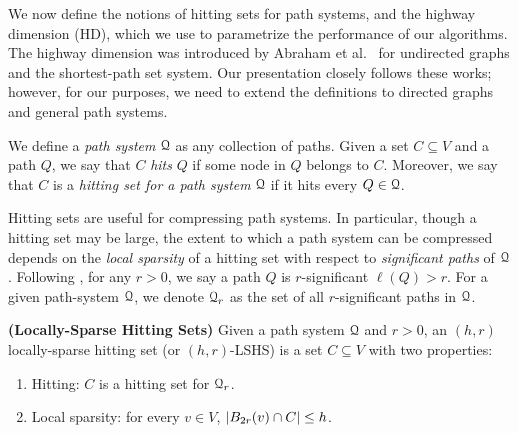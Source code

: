 
We now define the notions of hitting sets for path systems, and the highway dimension (HD), which we use to parametrize the performance of our algorithms. The highway dimension was introduced by Abraham et al.~\cite{highway2010,highway2013} for undirected graphs and the shortest-path set system. Our presentation closely follows these works; however, for our purposes, we need to extend the definitions to directed graphs and general path systems. 

We define a \emph{path system} $\calQ$ as any collection of paths. Given a set $C\subseteq V$ and a path $Q$, we say that $C$ \emph{hits} $Q$ if some node in $Q$ belongs to $C$. Moreover, we say that $C$ is a \emph{hitting set for a path system} $\calQ$ if it hits every $Q\in\calQ$.


Hitting sets are useful for compressing path systems. In particular, though a hitting set may be large, the extent to which a path system can be compressed depends on the \emph{local sparsity} of a hitting set with respect to \emph{significant paths} of $\calQ$. 
Following \cite{highway2013}, for any $r>0$, we say a path $Q$ is $r$-significant $\ell(Q)>r$. For a given path-system $\calQ$, we denote $\calQ_r$ as the set of all $r$-significant paths in $\calQ$.
\begin{definition}
\label{def:lshs}
\textbf{(Locally-Sparse Hitting Sets)} Given a path system $\calQ$ and $r>0$, an $(h,r)$ locally-sparse hitting set (or $(h,r)$-LSHS) is a set $C\subseteq V$ with two properties: 
\begin{enumerate}[nosep]
\item Hitting: $C$ is a hitting set for $\calQ_r$.
\item Local sparsity: for every $v\in V$, $\abs*{B_{2r}(v)\cap C}\leq h$.
\end{enumerate}
\end{definition}


